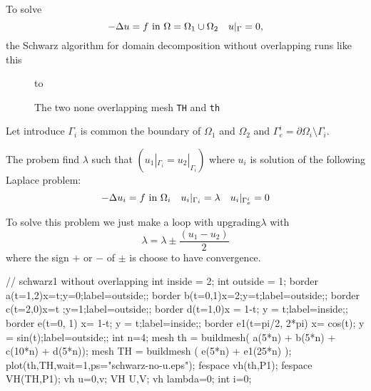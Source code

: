 \documentclass[twoside]{book}
\newif\ifpdf
\def\Blue#1{\textcolor{blue}{#1}}
\def\hin{\hbox{ in }}
\def\eq#1{\Blue{\[#1\]}}
\def\HLINE#1{\hbox to \hsize {#1}}
\begin{document}
\graphicspath{{./}{plots/}}
\ifpdf
\DeclareGraphicsExtensions{.pdf, .jpg, .tif}
\else
{}
\fi

\let\subsubsection\subsection
\let\subsection\section
\let\section\chapter




To solve
\eq{ -\Delta u =f \hin\Omega=\Omega_1\cup\Omega_2\quad u|_\Gamma=0,}
the Schwarz algorithm for domain decomposition without overlapping  runs like this

\begin{figure}[hbt]
\HLINE{\hss
\texttt{[image: schwarz-no-th]} \hss}
\caption{ The two none overlapping mesh \texttt{TH} and \texttt{th}  }
\end{figure}

Let introduce  $\Gamma_i$ is  common the boundary of $\Omega_1$ and
$\Omega_2$ and    $\Gamma_e^i= \partial \Omega_i \setminus \Gamma_i$.

The probem  find  $\lambda$ such that $ (u_1|_{\Gamma_i}=u_2|_{\Gamma_i}) $
where  $u_i$ is solution of the following Laplace problem:
\eq{
    -\Delta u_i=f\hin\Omega_i\quad
    u_i|_{\Gamma_i}=\lambda \quad
    u_i|_{\Gamma_e^i} = 0 
 }

To solve this problem we just make a loop
with upgrading$\lambda$ with
$$\lambda = \lambda \pm \frac{(u_1-u_2)}{2}$$
where the sign $+$ or $-$ of $\pm$ is choose to have convergence.

\bFF

// schwarz1 without overlapping
int inside = 2;
int outside = 1;
border a(t=1,2){x=t;y=0;label=outside;};
border b(t=0,1){x=2;y=t;label=outside;};
border c(t=2,0){x=t ;y=1;label=outside;};
border d(t=1,0){x = 1-t; y = t;label=inside;};
border e(t=0, 1){ x= 1-t; y = t;label=inside;};
border e1(t=pi/2, 2*pi){ x= cos(t); y = sin(t);label=outside;}; 
int n=4;
mesh th = buildmesh( a(5*n) + b(5*n) + c(10*n) + d(5*n));
mesh TH = buildmesh ( e(5*n) + e1(25*n) );
plot(th,TH,wait=1,ps="schwarz-no-u.eps");
fespace vh(th,P1);
fespace VH(TH,P1);
vh u=0,v; VH U,V;
vh lambda=0;
int i=0;
\end{document}
